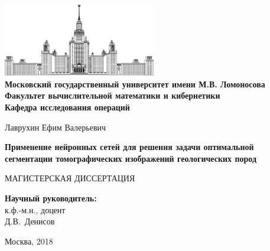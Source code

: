 \documentclass[14pt, a4paper, oneside, bold]{extarticle}
\begin{document}
\allowdisplaybreaks[1]

\begin{titlepage}
\begin{center}
\ \vspace{-1.5cm}

\includegraphics[width=0.5\textwidth]{data/images/msu_logo.eps}\\
{\bfseries Московский государственный университет имени М.В. Ломоносова \\
Факультет вычислительной математики и кибернетики\\
Кафедра исследования операций}

\vspace{3cm}

{\Large Лаврухин Ефим Валерьевич}

\vspace{1cm}

{\Large\bfseries
Применение нейронных сетей для решения задачи оптимальной сегментации томографических
изображений геологических пород\\}

\vspace{1cm}

{\textbf \large МАГИСТЕРСКАЯ ДИССЕРТАЦИЯ}
\end{center}

\vfill

\begin{flushright}
  \textbf{Научный руководитель:}\\
  к.ф.-м.н., доцент\\
  Д.В.~Денисов
\end{flushright}

\vfill

\begin{center}
Москва, 2018
\end{center}

\vspace{1cm}

\enlargethispage{2\baselineskip}

\end{titlepage}

\end{document}
